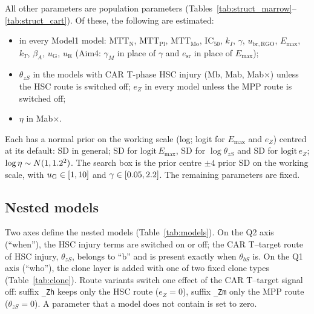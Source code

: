 \documentclass[11pt]{article}
\begin{document}
All other parameters are population parameters (Tables~\ref{tab:struct_marrow}--\ref{tab:struct_cart}). Of these, the following are estimated:
\begin{itemize}
\item in every Model1 model: $\mathrm{MTT}_{\mathrm{N}}$, $\mathrm{MTT}_{\mathrm{Pl}}$, $\mathrm{MTT}_{\mathrm{Mo}}$, $\mathrm{IC}_{50}$, $k_I$, $\gamma$, $u_{\mathrm{br,RGO}}$, $E_{\max}$, $k_T$, $\beta_A$, $u_{\mathrm{G}}$, $u_{\mathrm{R}}$ (Aim4: $\gamma_M$ in place of $\gamma$ and $e_{\mathrm{sr}}$ in place of $E_{\max}$);
\item $\theta_{zS}$ in the models with CAR T-phase HSC injury (Mb, Mab, Mab$\times$) unless the HSC route is switched off; $e_Z$ in every model unless the MPP route is switched off;
\item $\eta$ in Mab$\times$.
\end{itemize}
Each has a normal prior on the working scale (log; logit for $E_{\max}$ and $e_Z$) centred at its default: SD \valStructSd{} in general; SD \valEmaxSd{} for $\mathrm{logit}\,E_{\max}$, SD \valThzsSd{} for $\log\theta_{zS}$ and SD \valEzSd{} for $\mathrm{logit}\,e_Z$; $\log\eta\sim N(1,1.2^2)$. The search box is the prior centre $\pm4$ prior SD on the working scale, with $u_{\mathrm{G}}\in[1,10]$ and $\gamma\in[0.05,2.2]$. The remaining parameters are fixed.










\subsection{Nested models}\label{sec:nested}
Two axes define the nested models (Table~\ref{tab:models}). On the Q2 axis (``when''), the HSC injury terms are switched on or off; the CAR T--target route of HSC injury, $\theta_{zS}$, belongs to ``b'' and is present exactly when $\theta_{bS}$ is. On the Q1 axis (``who''), the clone layer is added with one of two fixed clone types (Table~\ref{tab:clone}). Route variants switch one effect of the CAR T--target signal off: suffix \texttt{\_Zh} keeps only the HSC route ($e_Z=0$), suffix \texttt{\_Zm} only the MPP route ($\theta_{zS}=0$). A parameter that a model does not contain is set to zero.
\end{document}
